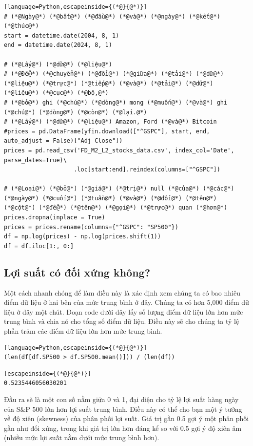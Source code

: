 \begin{lstlisting}[language=Python,escapeinside={(*@}{@*)}]
# (*@Ngày@*) (*@bắt@*) (*@đầu@*) (*@và@*) (*@ngày@*) (*@kết@*) (*@thúc@*)
start = datetime.date(2004, 8, 1)
end = datetime.date(2024, 8, 1)

# (*@Lấy@*) (*@dữ@*) (*@liệu@*)
# (*@Để@*) (*@chuyển@*) (*@đổi@*) (*@giữa@*) (*@tải@*) (*@dữ@*) (*@liệu@*) (*@trực@*) (*@tiếp@*) (*@và@*) (*@tải@*) (*@dữ@*) (*@liệu@*) (*@cục@*) (*@bộ,@*) 
# (*@bỏ@*) ghi (*@chú@*) (*@dòng@*) mong (*@muốn@*) (*@và@*) ghi (*@chú@*) (*@dòng@*) (*@còn@*) (*@lại.@*)
# (*@Lấy@*) (*@dữ@*) (*@liệu@*) Amazon, Ford (*@và@*) Bitcoin
#prices = pd.DataFrame(yfin.download(["^GSPC"], start, end, auto_adjust = False)["Adj Close"])
prices = pd.read_csv('FD_M2_L2_stocks_data.csv', index_col='Date', parse_dates=True)\
                    .loc[start:end].reindex(columns=["^GSPC"])

# (*@Loại@*) (*@bỏ@*) (*@giá@*) (*@trị@*) null (*@của@*) (*@các@*) (*@ngày@*) (*@cuối@*) (*@tuần@*) (*@và@*) (*@đổi@*) (*@tên@*) (*@cột@*) (*@để@*) (*@tên@*) (*@gọi@*) (*@trực@*) quan (*@hơn@*)
prices.dropna(inplace = True)
prices = prices.rename(columns={"^GSPC": "SP500"})
df = np.log(prices) - np.log(prices.shift(1))
df = df.iloc[1:, 0:]
\end{lstlisting}

\subsection{Lợi suất có đối xứng không?}

Một cách nhanh chóng để làm điều này là xác định xem chúng ta có bao nhiêu điểm dữ liệu ở hai bên của mức trung bình ở đây. Chúng ta có hơn 5,000 điểm dữ liệu ở đây một chút. Đoạn code dưới đây lấy số lượng điểm dữ liệu lớn hơn mức trung bình và chia nó cho tổng số điểm dữ liệu. Điều này sẽ cho chúng ta tỷ lệ phần trăm các điểm dữ liệu lớn hơn mức trung bình.

\begin{lstlisting}[language=Python,escapeinside={(*@}{@*)}]
(len(df[df.SP500 > df.SP500.mean()])) / (len(df))
\end{lstlisting}

\begin{lstlisting}[escapeinside={(*@}{@*)}]
0.5235446056030201
\end{lstlisting}

Đầu ra sẽ là một con số nằm giữa 0 và 1, đại diện cho tỷ lệ lợi suất hàng ngày của S\&P 500 lớn hơn lợi suất trung bình. Điều này có thể cho bạn một ý tưởng về độ xiên (skewness) của phân phối lợi suất. Giá trị gần 0.5 gợi ý một phân phối gần như đối xứng, trong khi giá trị lớn hơn đáng kể so với 0.5 gợi ý độ xiên âm (nhiều mức lợi suất nằm dưới mức trung bình hơn).

